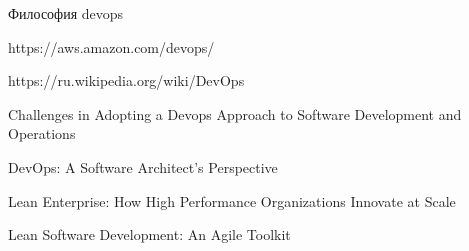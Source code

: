 

\begin{enumerate}[{label=[\arabic{*}]}]

\item Философия devops
    \label{book:Effective Devops}

\item https://aws.amazon.com/devops/
    \label{site:aws.amazon.com/devops}

\item https://ru.wikipedia.org/wiki/DevOps
    \label{site:ru.wikipedia.org/wiki/devops}

\item Challenges in Adopting a Devops Approach to Software Development and Operations
    \label{article:Challenges in Adopting a Devops}

\item DevOps: A Software Architect's Perspective
    \label{book:DevOps: A Software Architect's Perspective}

\item Lean Enterprise: How High Performance Organizations Innovate at Scale
    \label{book:Lean Enterprise}
 
\item Lean Software Development: An Agile Toolkit
    \label{book:Lean Software Development}

\end{enumerate}
